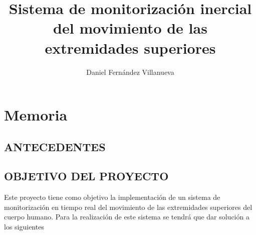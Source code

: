 \documentclass[10pt,a4paper]{report}
\author{Daniel Fernández Villanueva}
\title{Sistema de monitorización inercial del movimiento de las extremidades superiores}
\begin{document}
\maketitle

\tableofcontents


\part{Memoria}

\pagestyle{headings}



\chapter{ANTECEDENTES}



\chapter{OBJETIVO DEL PROYECTO}

Este proyecto tiene como objetivo la implementación de un sistema de monitorización en tiempo real del movimiento de las extremidades superiores del cuerpo humano. Para la realización de este sistema se tendrá que dar solución a los siguientes
\end{document}
